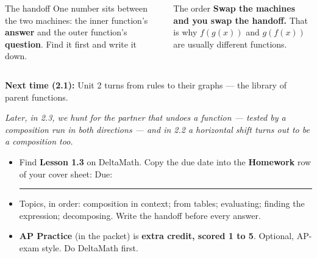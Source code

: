 \documentclass[aspectratio=169, 11pt]{beamer}
\begin{document}
\begin{frame}[t, plain]

  \begin{columns}[T, onlytextwidth]
      \begin{block}{The handoff}
        One number sits between the two machines: the inner function's \textbf{answer} and the
        outer function's \textbf{question}. Find it first and write it down.
      \end{block}
      \begin{block}{The order}
        \textbf{Swap the machines and you swap the handoff.} That is why \(f(g(x))\) and
        \(g(f(x))\) are usually different functions.
      \end{block}
  \end{columns}

  \bigskip
  \textbf{Next time (2.1):} Unit 2 turns from rules to their graphs --- the library of parent
  functions.

  \smallskip
  \textit{Later, in 2.3, we hunt for the partner that undoes a function --- tested by a composition
  run in both directions --- and in 2.2 a horizontal shift turns out to be a composition too.}
\end{frame}

\begin{frame}[t, plain]

  \begin{itemize}\setlength{\itemsep}{8pt}
    \item Find \textbf{Lesson 1.3} on DeltaMath. Copy the due date into the \textbf{Homework}
          row of your cover sheet: \quad Due: \rule{3cm}{0.4pt}
    \item Topics, in order: composition in context; from tables; evaluating; finding the
          expression; decomposing. Write the handoff before every answer.
    \item \textbf{AP Practice} (in the packet) is \textbf{extra credit, scored 1 to 5}. Optional, AP-exam
          style. Do DeltaMath first.
  \end{itemize}
\end{frame}
\end{document}
